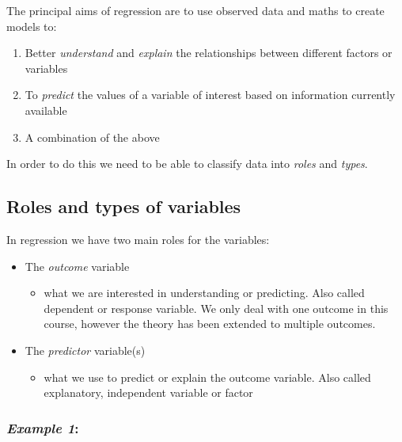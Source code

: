 \documentclass[
]{gitbook}
\providecommand{\tightlist}{%
  \setlength{\itemsep}{0pt}\setlength{\parskip}{0pt}}
\begin{document}
The principal aims of regression are to use observed data and maths to create models to:

\begin{enumerate}
\def\labelenumi{\arabic{enumi}.}
\tightlist
\item
  Better \emph{understand} and \emph{explain} the relationships between different factors or variables
\item
  To \emph{predict} the values of a variable of interest based on information currently available
\item
  A combination of the above
\end{enumerate}

In order to do this we need to be able to classify data into \emph{roles} and \emph{types}.

\hypertarget{roles-and-types-of-variables}{%
\subsection{Roles and types of variables}\label{roles-and-types-of-variables}}

In regression we have two main roles for the variables:

\begin{itemize}
\tightlist
\item
  The \emph{outcome} variable

  \begin{itemize}
  \tightlist
  \item
    what we are interested in understanding or predicting. Also called dependent or response variable. We only deal with one outcome in this course, however the theory has been extended to multiple outcomes.
  \end{itemize}
\item
  The \emph{predictor} variable(s)

  \begin{itemize}
  \tightlist
  \item
    what we use to predict or explain the outcome variable. Also called explanatory, independent variable or factor
  \end{itemize}
\end{itemize}

\hypertarget{example-1}{%
\subsubsection{\texorpdfstring{\emph{Example 1}:}{Example 1:}}\label{example-1}}
\end{document}
